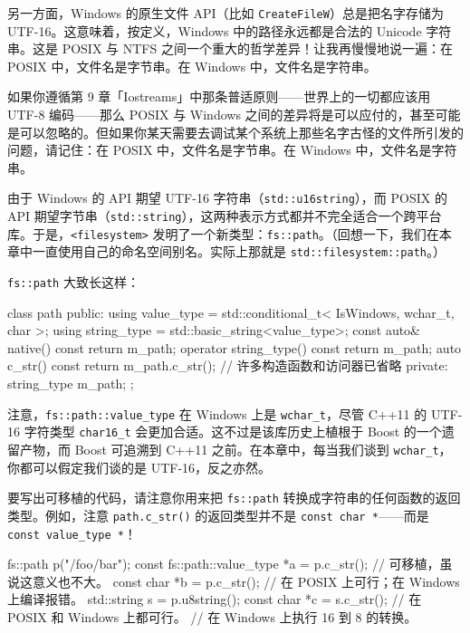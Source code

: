 另一方面，Windows 的原生文件 API（比如 \texttt{Create\allowbreak{}File\allowbreak{}W}）总是把名字存储为 UTF-16。这意味着，按定义，Windows 中的路径永远都是合法的 Unicode 字符串。这是 POSIX 与 NTFS 之间一个重大的哲学差异！让我再慢慢地说一遍：在 POSIX 中，文件名是字节串。在 Windows 中，文件名是字符串。

如果你遵循第 9 章「Iostreams」中那条普适原则——世界上的一切都应该用 UTF-8 编码——那么 POSIX 与 Windows 之间的差异将是可以应付的，甚至可能是可以忽略的。但如果你某天需要去调试某个系统上那些名字古怪的文件所引发的问题，请记住：在 POSIX 中，文件名是字节串。在 Windows 中，文件名是字符串。

由于 Windows 的 API 期望 UTF-16 字符串（\texttt{std::\allowbreak{}u16string}），而 POSIX 的 API 期望字节串（\texttt{std::\allowbreak{}string}），这两种表示方式都并不完全适合一个跨平台库。于是，\texttt{<filesystem>\allowbreak{}} 发明了一个新类型：\texttt{fs::\allowbreak{}path}。（回想一下，我们在本章中一直使用自己的命名空间别名。实际上那就是 \texttt{std::\allowbreak{}filesystem::\allowbreak{}path}。）

\texttt{fs::\allowbreak{}path} 大致长这样：

\begin{codebox}[cpp]
     class path {
     public:
       using value_type = std::conditional_t<
         IsWindows, wchar_t, char
       >;
       using string_type = std::basic_string<value_type>;
       const auto& native() const { return m_path; }
       operator string_type() const { return m_path; }
       auto c_str() const { return m_path.c_str(); }
       // 许多构造函数和访问器已省略
     private:
       string_type m_path;
     };
\end{codebox}

注意，\texttt{fs::\allowbreak{}path::\allowbreak{}value\_\allowbreak{}type} 在 Windows 上是 \texttt{wchar\_\allowbreak{}t}，尽管 C++11 的 UTF-16 字符类型 \texttt{char16\_\allowbreak{}t} 会更加合适。这不过是该库历史上植根于 Boost 的一个遗留产物，而 Boost 可追溯到 C++11 之前。在本章中，每当我们谈到 \texttt{wchar\_\allowbreak{}t}，你都可以假定我们谈的是 UTF-16，反之亦然。

要写出可移植的代码，请注意你用来把 \texttt{fs::\allowbreak{}path} 转换成字符串的任何函数的返回类型。例如，注意 \texttt{path.\allowbreak{}c\_\allowbreak{}str(\allowbreak{})\allowbreak{}} 的返回类型并不是 \texttt{const char *}——而是 \texttt{const value\_\allowbreak{}type *}！

\begin{codebox}[cpp]
     fs::path p("/foo/bar");
     const fs::path::value_type *a = p.c_str();
       // 可移植，虽说这意义也不大。
     const char *b = p.c_str();
       // 在 POSIX 上可行；在 Windows 上编译报错。
     std::string s = p.u8string();
     const char *c = s.c_str();
       // 在 POSIX 和 Windows 上都可行。
       // 在 Windows 上执行 16 到 8 的转换。
\end{codebox}

